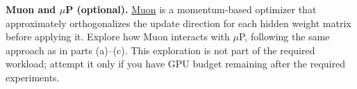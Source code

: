 \item \textbf{Muon and $\mu$P (optional).}
\href{https://kellerjordan.github.io/posts/muon/}{Muon} is a momentum-based
optimizer that approximately orthogonalizes the update direction for each
hidden weight matrix before applying it. Explore how Muon interacts with
$\mu$P, following the same approach as in parts (a)--(c).
This exploration is not part of the required workload; attempt it only if you
have GPU budget remaining after the required experiments.
